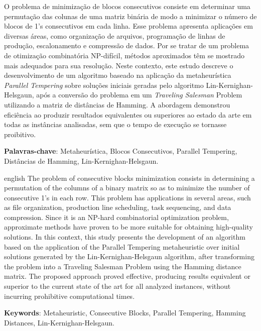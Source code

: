 \documentclass[
	12pt,				%
	openany,			%
	oneside,			%
	a4paper,			%
	english,			%
	french,				%
	spanish,			%
	brazil				%
	]{abntex2}
\begin{document}
\setlength{\absparsep}{18pt} %
\begin{resumo}[Resumo]
	O problema de minimização de blocos consecutivos consiste em determinar uma permutação das colunas de uma matriz binária de modo a minimizar o número de blocos de 1’s consecutivos em cada linha. Esse problema apresenta aplicações em diversas áreas, como organização de arquivos, programação de linhas de produção, escalonamento e compressão de dados. Por se tratar de um problema de otimização combinatória NP-difícil, métodos aproximados têm se mostrado mais adequados para sua resolução. Neste contexto, este estudo descreve o desenvolvimento de um algoritmo baseado na aplicação da metaheurística \textit{Parallel Tempering} sobre soluções iniciais geradas pelo algoritmo Lin-Kernighan-Helsgaun, após a conversão do problema em um \textit{Traveling Salesman} Problem utilizando a matriz de distâncias de Hamming. A abordagem demonstrou eficiência ao produzir resultados equivalentes ou superiores ao estado da arte em todas as instâncias analisadas, sem que o tempo de execução se tornasse proibitivo.

	\textbf{Palavras-chave}: Metaheurística, Blocos Consecutivos, Parallel Tempering, Distâncias de Hamming, Lin-Kernighan-Helsgaun.
\end{resumo}


\begin{resumo}[Abstract]
	\begin{otherlanguage*}{english}
		The problem of consecutive blocks minimization consists in determining a permutation of the columns of a binary matrix so as to minimize the number of consecutive 1’s in each row. This problem has applications in several areas, such as file organization, production line scheduling, task sequencing, and data compression. Since it is an NP-hard combinatorial optimization problem, approximate methods have proven to be more suitable for obtaining high-quality solutions. In this context, this study presents the development of an algorithm based on the application of the Parallel Tempering metaheuristic over initial solutions generated by the Lin-Kernighan-Helsgaun algorithm, after transforming the problem into a Traveling Salesman Problem using the Hamming distance matrix. The proposed approach proved effective, producing results equivalent or superior to the current state of the art for all analyzed instances, without incurring prohibitive computational times.

		\textbf{Keywords}: Metaheuristic, Consecutive Blocks, Parallel Tempering, Hamming Distances, Lin-Kernighan-Helsgaun.
	\end{otherlanguage*}
\end{resumo}
\end{document}
